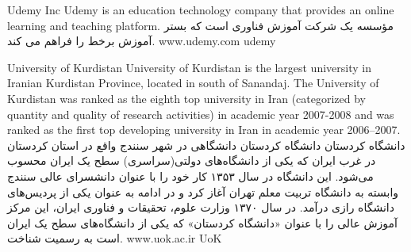 \instituteC
{Udemy Inc}
{Udemy is an education technology company that provides an online learning and teaching platform.}
{}
{مؤسسه }
{یک شرکت آموزش فناوری است که بستر آموزش برخط را فراهم می کند.}
{}
{www.udemy.com}
{udemy}

\instituteC
{University of Kurdistan}
{University of Kurdistan is the largest university in Iranian Kurdistan Province, located in south of Sanandaj.
The University of Kurdistan was ranked as the eighth top university in Iran (categorized by quantity and quality of research activities)
in academic year 2007-2008 and was ranked as the first top developing university in Iran in academic year 2006–2007.}
{}
{دانشگاه كردستان}
{دانشگاه کردستان دانشگاهی در شهر سنندج واقع در استان کردستان در غرب ایران که یکی از دانشگاه‌های دولتی(سراسری) سطح یک ایران محسوب می‌شود.
این دانشگاه در سال ۱۳۵۳ کار خود را با عنوان دانشسرای عالی سنندج وابسته به دانشگاه تربیت معلم تهران آغاز کرد و در ادامه به عنوان یکی از پردیس‌های دانشگاه رازی درآمد.
در سال ۱۳۷۰ وزارت علوم، تحقیقات و فناوری ایران، این مرکز آموزش عالی را با عنوان «دانشگاه کردستان» که یکی از دانشگاه‌های سطح یک ایران است به رسمیت شناخت.}
{}
{www.uok.ac.ir}
{UoK}
